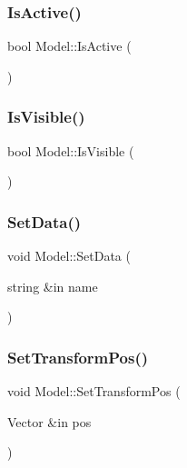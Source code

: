 \hypertarget{class_model_a40357823a765007f272e2ede1ff9d248}{}\label{class_model_a40357823a765007f272e2ede1ff9d248} 
\subsubsection{\texorpdfstring{Is\+Active()}{IsActive()}}
{\footnotesize\ttfamily bool Model\+::\+Is\+Active (\begin{DoxyParamCaption}{ }\end{DoxyParamCaption})}

\hypertarget{class_model_aa988a434cd21e3a5318865193be886b6}{}\label{class_model_aa988a434cd21e3a5318865193be886b6} 
\subsubsection{\texorpdfstring{Is\+Visible()}{IsVisible()}}
{\footnotesize\ttfamily bool Model\+::\+Is\+Visible (\begin{DoxyParamCaption}{ }\end{DoxyParamCaption})}

\hypertarget{class_model_ab2b52d2c8f8eee944a4aeb06085c2c57}{}\label{class_model_ab2b52d2c8f8eee944a4aeb06085c2c57} 
\subsubsection{\texorpdfstring{Set\+Data()}{SetData()}}
{\footnotesize\ttfamily void Model\+::\+Set\+Data (\begin{DoxyParamCaption}\item[{string \&in}]{name }\end{DoxyParamCaption})}

\hypertarget{class_model_a8063a25a2533c896d1af098f65a14edc}{}\label{class_model_a8063a25a2533c896d1af098f65a14edc} 
\subsubsection{\texorpdfstring{Set\+Transform\+Pos()}{SetTransformPos()}}
{\footnotesize\ttfamily void Model\+::\+Set\+Transform\+Pos (\begin{DoxyParamCaption}\item[{Vector \&in}]{pos }\end{DoxyParamCaption})}

